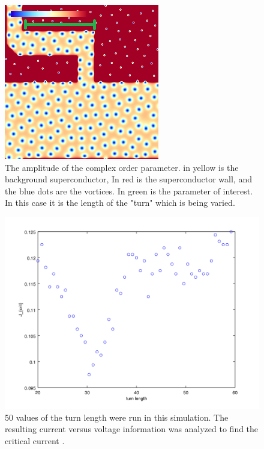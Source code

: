 \begin{figure}[htbp]
\begin{center}
\includegraphics[scale=.50]{oneKinkDone.png}
\caption{ The amplitude of the complex order parameter. in yellow is the background superconductor, In red is the superconductor wall, and the blue dots are the vortices. In green is the parameter of interest. In this case it is the length of the "turn" which is being varied.}
\label{oneSidedY}
\end{center}
\end{figure}

\begin{figure}[htbp]
\begin{center}
\includegraphics[scale=.50]{kinkScan.png}
\caption{ 50 values of the turn length were run in this simulation. The resulting current versus voltage information was analyzed to find the critical current .  }
\label{normalYscan}
\end{center}
\end{figure}



